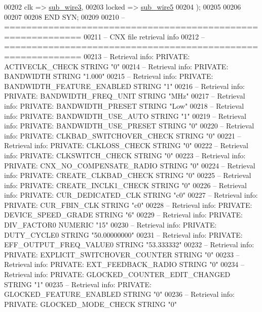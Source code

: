 \begin{DoxyCode}
{00202         clk => \hyperlink{classpll_1_1_s_y_n_adf9c19689a8299f2f295de58153514e4}{sub\_wire3},
00203         locked => \hyperlink{classpll_1_1_s_y_n_a428d095cdf1fa14d47c103e910135ebb}{sub\_wire5}
00204     \textcolor{vhdlchar}{)};
00205 
00206 
00207 
00208 \textcolor{keywordflow}{END} \textcolor{vhdlchar}{SYN};
00209 
00210 \textcolor{keyword}{-- ============================================================}
00211 \textcolor{keyword}{-- CNX file retrieval info}
00212 \textcolor{keyword}{-- ============================================================}
00213 \textcolor{keyword}{-- Retrieval info: PRIVATE: ACTIVECLK\_CHECK STRING "0"}
00214 \textcolor{keyword}{-- Retrieval info: PRIVATE: BANDWIDTH STRING "1.000"}
00215 \textcolor{keyword}{-- Retrieval info: PRIVATE: BANDWIDTH\_FEATURE\_ENABLED STRING "1"}
00216 \textcolor{keyword}{-- Retrieval info: PRIVATE: BANDWIDTH\_FREQ\_UNIT STRING "MHz"}
00217 \textcolor{keyword}{-- Retrieval info: PRIVATE: BANDWIDTH\_PRESET STRING "Low"}
00218 \textcolor{keyword}{-- Retrieval info: PRIVATE: BANDWIDTH\_USE\_AUTO STRING "1"}
00219 \textcolor{keyword}{-- Retrieval info: PRIVATE: BANDWIDTH\_USE\_PRESET STRING "0"}
00220 \textcolor{keyword}{-- Retrieval info: PRIVATE: CLKBAD\_SWITCHOVER\_CHECK STRING "0"}
00221 \textcolor{keyword}{-- Retrieval info: PRIVATE: CLKLOSS\_CHECK STRING "0"}
00222 \textcolor{keyword}{-- Retrieval info: PRIVATE: CLKSWITCH\_CHECK STRING "0"}
00223 \textcolor{keyword}{-- Retrieval info: PRIVATE: CNX\_NO\_COMPENSATE\_RADIO STRING "0"}
00224 \textcolor{keyword}{-- Retrieval info: PRIVATE: CREATE\_CLKBAD\_CHECK STRING "0"}
00225 \textcolor{keyword}{-- Retrieval info: PRIVATE: CREATE\_INCLK1\_CHECK STRING "0"}
00226 \textcolor{keyword}{-- Retrieval info: PRIVATE: CUR\_DEDICATED\_CLK STRING "c0"}
00227 \textcolor{keyword}{-- Retrieval info: PRIVATE: CUR\_FBIN\_CLK STRING "c0"}
00228 \textcolor{keyword}{-- Retrieval info: PRIVATE: DEVICE\_SPEED\_GRADE STRING "6"}
00229 \textcolor{keyword}{-- Retrieval info: PRIVATE: DIV\_FACTOR0 NUMERIC "15"}
00230 \textcolor{keyword}{-- Retrieval info: PRIVATE: DUTY\_CYCLE0 STRING "50.00000000"}
00231 \textcolor{keyword}{-- Retrieval info: PRIVATE: EFF\_OUTPUT\_FREQ\_VALUE0 STRING "53.333332"}
00232 \textcolor{keyword}{-- Retrieval info: PRIVATE: EXPLICIT\_SWITCHOVER\_COUNTER STRING "0"}
00233 \textcolor{keyword}{-- Retrieval info: PRIVATE: EXT\_FEEDBACK\_RADIO STRING "0"}
00234 \textcolor{keyword}{-- Retrieval info: PRIVATE: GLOCKED\_COUNTER\_EDIT\_CHANGED STRING "1"}
00235 \textcolor{keyword}{-- Retrieval info: PRIVATE: GLOCKED\_FEATURE\_ENABLED STRING "0"}
00236 \textcolor{keyword}{-- Retrieval info: PRIVATE: GLOCKED\_MODE\_CHECK STRING "0"}
}
\end{DoxyCode}
